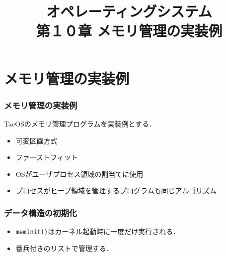 \documentclass{beamer}                   %
\begin{document}
\title[主記憶]{オペレーティングシステム\\第１０章 メモリ管理の実装例}
\date{}

\begin{frame}
  \titlepage
\end{frame}


\section{メモリ管理の実装例}
\begin{frame}
  \frametitle{メモリ管理の実装例}
  TacOSのメモリ管理プログラムを実装例とする．
  \begin{itemize}
  \item 可変区画方式
  \item ファーストフィット
  \item OSがユーザプロセス領域の割当てに使用
  \item プロセスがヒープ領域を管理するプログラムも同じアルゴリズム
  \end{itemize}
\end{frame}

\begin{frame}
  \frametitle{データ構造の初期化}
  
  \begin{itemize}
  \item {\tt memInit()}はカーネル起動時に一度だけ実行される．
  \item 番兵付きのリストで管理する．
  \end{itemize}
\end{frame}
\end{document}
